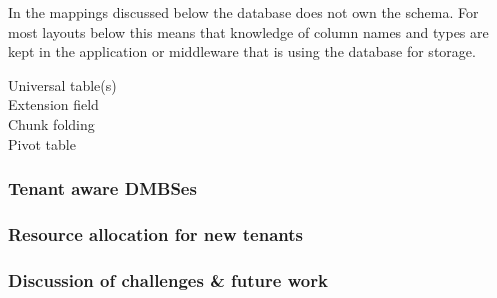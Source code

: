 In the mappings discussed below the database does not own the schema. 
For most layouts below this means that knowledge of column names and types are kept in the application or middleware that is using the database for storage. 
\begin{description}
	\item[Universal table(s)]

	\item[Extension field]
	\item[Chunk folding] %
	\item[Pivot table]
\end{description}
\subsubsection{Tenant aware DMBSes}

\subsubsection{Resource allocation for new tenants}

\subsubsection{Discussion of challenges \& future work}
